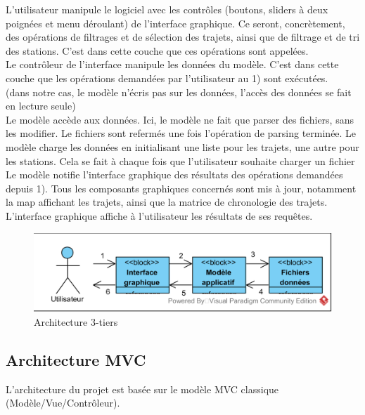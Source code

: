 \documentclass[12pt]{article}
\begin{document}
		L'utilisateur manipule le logiciel avec les contrôles (boutons, sliders à deux
		poignées et menu déroulant) de l’interface graphique. Ce seront, concrètement,
		des opérations de filtrages et de sélection des trajets, ainsi que de filtrage
		et de tri des stations. C’est dans cette couche que ces opérations sont appelées. \\
		
		Le contrôleur de l’interface manipule les données du modèle. C’est dans cette
		couche que les opérations demandées par l’utilisateur au 1) sont exécutées.\\
		
		(dans notre cas, le modèle n’écris pas sur les données, l’accès des données se
		fait en lecture seule)\\
		
		Le modèle accède aux données. Ici, le modèle ne fait que parser des fichiers,
		sans les modifier. Le fichiers sont refermés une fois l’opération de parsing
		terminée. Le modèle charge les données en initialisant une liste pour les trajets,
		une autre pour les stations. Cela se fait à chaque fois que l’utilisateur
		souhaite charger un fichier\\
		
		Le modèle notifie l’interface graphique des résultats des opérations demandées
		depuis 1). Tous les composants graphiques concernés sont mis à jour, notamment la
		map affichant les trajets, ainsi que la matrice de chronologie des trajets.\\
		
		L’interface graphique affiche à l'utilisateur les résultats de ses requêtes.\\
		
		\begin{figure}[!h]
		\begin{center}
		\includegraphics[scale=1]{dia_block_3tiers.png}
		\caption{Architecture 3-tiers}
		\end{center}
		\end{figure}

		\subsection{Architecture MVC}
		L’architecture du projet est basée sur le modèle MVC classique (Modèle/Vue/Contrôleur).\\
		
\end{document}
